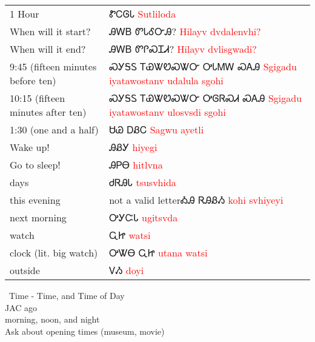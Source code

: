 \vfill\newpage\begin{minipage}{\linewidth}\begin{tabular}{p{3cm} p{11cm}}
1 Hour & ᏑᏟᎶᏓ 
 \newline \textcolor{red}{Sutliloda}\\
When will it start? & ᎯᎳᏴ ᏛᏓᎴᏅᎯ? 
 \newline \textcolor{red}{Hilayv dvdalenvhi?}\\
When will it end? & ᎯᎳᏴ ᏛᎵᏍᏆᏗ? 
 \newline \textcolor{red}{Hilayv dvlisgwadi?}\\
9:45 (fifteen minutes before ten) & ᏍᎩᎦᏚ ᎢᏯᏔᏬᏍᏔᏅ ᎤᏓᎷᎳ ᏍᎪᎯ 
 \newline \textcolor{red}{Sgigadu iyatawostanv udalula sgohi}\\
10:15 (fifteen minutes after ten) & ᏍᎩᎦᏚ ᎢᏯᏔᏬᏍᏔᏅ ᎤᎶᏒᏍᏗ ᏍᎪᎯ 
 \newline \textcolor{red}{Sgigadu iyatawostanv ulosvsdi sgohi}\\
1:30 (one and a half) & ᏌᏊ ᎠᏰᏟ 
 \newline \textcolor{red}{Sagwu ayetli}\\
Wake up! & ᎯᏰᎩ 
 \newline \textcolor{red}{hiyegi}\\
Go to sleep! & ᎯᏢᎾ 
 \newline \textcolor{red}{hitlvna}\\
days & ᏧᏒᎯᏓ 
 \newline \textcolor{red}{tsusvhida}\\
this evening & not a valid letterᎣᎯ ᏒᎯᏰᏱ 
 \newline \textcolor{red}{kohi svhiyeyi}\\
next morning & ᎤᎩᏨᏓ 
 \newline \textcolor{red}{ugitsvda}\\
watch & ᏩᏥ 
 \newline \textcolor{red}{watsi}\\
clock (lit. big watch) & ᎤᏔᎾ ᏩᏥ 
 \newline \textcolor{red}{utana watsi}\\
outside & ᏙᏱ 
 \newline \textcolor{red}{doyi}\\
\end{tabular}
\end{minipage}

\ \newline\noindent Time - Time, and Time of Day\\
JAC ago\\
morning, noon, and night\\
Ask about opening times (museum, movie)\cite{walcpp42}\cite{walcpp47}\\


